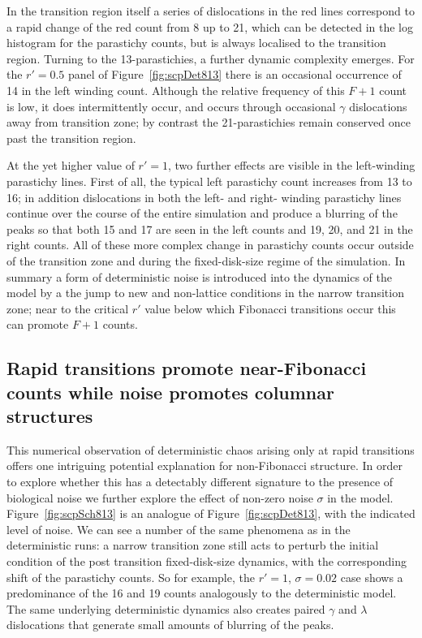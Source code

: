   In the transition region itself a series of dislocations in the red lines correspond to a rapid change of the red count from 8 up to 21, which can be detected in the 
 log histogram for the parastichy counts, but is always localised to the transition region. Turning to the 13-parastichies,  a further dynamic complexity emerges.
 For the  $r'=0.5$ panel of  Figure~\ref{fig:scpDet813} there is an occasional occurrence of 14 in the left winding count. Although the relative frequency of this $F+1$ count is low, it does intermittently occur, and occurs through occasional $\gamma$ dislocations away from  transition zone; by contrast the 21-parastichies remain conserved once past the transition region. 
 
At the yet higher value of $r'=1$, two further effects are visible in the left-winding parastichy lines. First of all,  the typical left parastichy count increases from 13 to 16; in addition dislocations in both the left- and right- winding parastichy lines continue over the  course of the entire simulation and produce a blurring of the peaks so that both 15 and 17 are seen in the left counts and 19, 20, and 21 in the right counts. All of these more complex change in parastichy counts occur outside of the transition zone and during the fixed-disk-size regime of the simulation.  In summary a form of deterministic noise is introduced into the dynamics of the model by a the jump to new and non-lattice conditions  in the narrow transition zone; near to the critical $r'$ value below which Fibonacci transitions occur this can promote $F+1$ counts.


\subsection{Rapid transitions promote near-Fibonacci counts while noise promotes columnar structures}
This numerical observation of deterministic chaos arising only at rapid transitions offers one intriguing potential explanation for non-Fibonacci structure. In order to explore whether this has a detectably different signature to the presence of biological noise we further explore the effect of non-zero noise $\sigma$ in the model.   
Figure~\ref{fig:scpSch813} is an analogue of Figure~\ref{fig:scpDet813},
 with the indicated level of noise.
We can see a number of the same phenomena as in the deterministic runs: a narrow transition zone still acts to perturb the initial condition of the post transition fixed-disk-size dynamics, with the corresponding shift of the parastichy counts. So for example, the $r'=1$, $\sigma=0.02$ case shows a predominance of the 16 and 19 counts analogously to the deterministic model. The same underlying deterministic dynamics also creates paired $\gamma$ and $\lambda$ dislocations that generate small amounts of blurring of the peaks.
 
